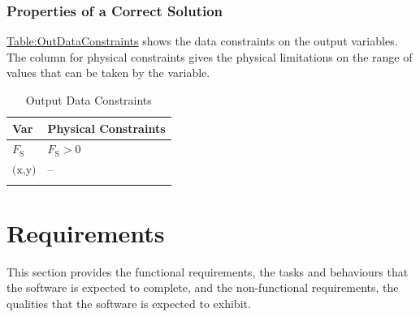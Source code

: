 \documentclass[12pt]{article}
\begin{document}
\subsubsection{Properties of a Correct Solution}
\label{Sec:CorSolProps}
\hyperref[Table:OutDataConstraints]{Table:OutDataConstraints} shows the data constraints on the output variables. The column for physical constraints gives the physical limitations on the range of values that can be taken by the variable.
\begin{longtable}{l l}
\toprule
\textbf{Var} & \textbf{Physical Constraints}
\\
\midrule
\endhead
${F_{\text{S}}}$ & ${F_{\text{S}}}>0$
\\
$\text{(x,y)}$ & --
\\
\bottomrule
\caption{Output Data Constraints}
\label{Table:OutDataConstraints}
\end{longtable}
\section{Requirements}
\label{Sec:Requirements}
This section provides the functional requirements, the tasks and behaviours that the software is expected to complete, and the non-functional requirements, the qualities that the software is expected to exhibit.
\end{document}
